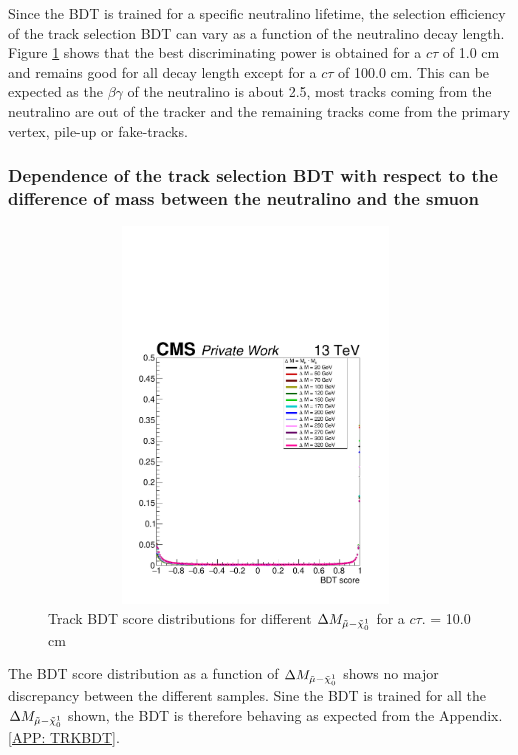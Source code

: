 \documentclass{cernatlasnote}
\begin{document}
\FloatBarrier
Since the BDT is trained for a specific neutralino lifetime, the selection efficiency of the track selection BDT can vary as a function of the neutralino decay length. Figure \ref{fig:BDTctau} shows that the best discriminating power is obtained for a $c\tau$ of 1.0 cm and remains good for all decay length except for a $c\tau$ of 100.0 cm. This can be expected as the $\beta\gamma$ of the neutralino is about 2.5, most tracks coming from the neutralino are out of the tracker and the remaining tracks come from the primary vertex, pile-up or fake-tracks.

\subsubsection{Dependence of the track selection BDT with respect to the difference of mass between the neutralino and the smuon}

\begin{figure}[ht]
\centering
\includegraphics[height=10cm, width=11cm, trim= 0cm 0cm 0cm 0cm,clip]{images/BDT/plotBDTTRK_dm.pdf}
\caption{\label{fig:BDTctau} Track BDT score distributions for different $\Delta M_{\Tilde{\mu}-\Tilde{\chi}^{1}_{0}}$ for a $c\tau$. = 10.0 cm }
\end{figure}

The BDT score distribution as a function of $\Delta M_{\Tilde{\mu}-\Tilde{\chi}^{1}_{0}}$  shows no major discrepancy between the different samples. Sine the BDT is trained for all the $\Delta M_{\Tilde{\mu}-\Tilde{\chi}^{1}_{0}}$ shown, the BDT is therefore behaving as expected from the Appendix.\ref{APP: TRKBDT}.
\end{document}
